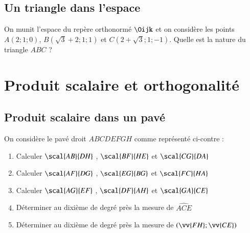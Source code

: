 \documentclass[oneside,12pt]{article}          %
\begin{document}
\subsection{Un triangle dans l'espace}
On munit l'espace du repère orthonormé $\Oijk$ et on considère les points $A(2;1;0)$, $ B(\sqrt{3}+2;1;1)$ et $C(2+\sqrt{3};1;-1)$. Quelle est la nature du triangle $ABC$ ?



\section{Produit scalaire et orthogonalité}

\subsection{Produit scalaire dans un pavé}

\begin{minipage}{0.65\textwidth}
    On considère le pavé droit $ABCDEFGH$ comme représenté ci-contre :
    \begin{enumerate}
        \item Calculer $\scal{AB}{DH}$ , $\scal{BF}{HE}$ et $\scal{CG}{DA}$
        \item Calculer $\scal{AF}{DG}$ , $\scal{EG}{BG}$ et $\scal{FC}{HA}$
        \item Calculer $\scal{AG}{EF}$ , $\scal{DF}{AH}$ et $\scal{GA}{CE}$
        \item Déterminer au dixième de degré près la mesure de $\widehat{ACE}$
        \item Déterminer au dixième de degré près la mesure de $(\vv{FH};\vv{CE})$
    \end{enumerate}
\end{minipage}
\begin{minipage}{0.34\textwidth}
\end{minipage}
\end{document}
